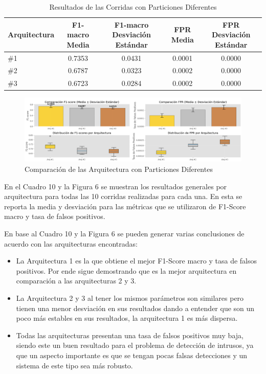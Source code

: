 \documentclass[12pt,a4paper]{article}
\begin{document}
\begin{table}[ht]
  \centering
  \tiny
  \begin{tabular}{lcccc}
    \hline
    Arquitectura & F1-macro Media & F1-macro Desviación Estándar & FPR Media & FPR Desviación Estándar \\
    \hline
    \#1 & 0.7353 & 0.0431 & 0.0001 & 0.0000 \\
    \#2 & 0.6787 & 0.0323 & 0.0002 & 0.0000 \\
    \#3 & 0.6723 & 0.0284 & 0.0002 & 0.0000 \\
    \hline
  \end{tabular}
  \caption{Resultados de las Corridas con Particiones Diferentes}
  \label{tab:corridas_part_dt}
\end{table}

\begin{figure}[H]
  \centering
  \includegraphics[width=1\textwidth]{../img/ComparacionPartArqui.png}
  \caption{Comparación de las Arquitectura con Particiones Diferentes}\label{fig:partition-architectures-decision-tree}
\end{figure}

En el Cuadro 10 y la Figura 6 se muestran los resultados generales por arquitectura para todas las 10 corridas realizadas para cada una.
En esta se reporta la media y desviación para las métricas que se utilizaron de F1-Score macro y tasa de falsos positivos.

En base al Cuadro 10 y la Figura 6 se pueden generar varias conclusiones de acuerdo con las arquitecturas encontradas:

\begin{itemize}
  \item La Arquitectura 1 es la que obtiene el mejor F1-Score macro y tasa de falsos positivos. Por ende
    sigue demostrando que es la mejor arquitectura en comparación a las arquitecturas 2 y 3.
  \item La Arquitectura 2 y 3 al tener los mismos parámetros son similares pero tienen una menor desviación en sus resultados
    dando a entender que son un poco más estables en sus resultados, la arquitectura 1 es más dispersa.
  \item Todas las arquitecturas presentan una tasa de falsos positivos muy baja, siendo este un buen resultado
    para el problema de detección de intrusos, ya que un aspecto importante es que se tengan pocas falsas detecciones
    y un sistema de este tipo sea más robusto.
\end{itemize}
\end{document}
